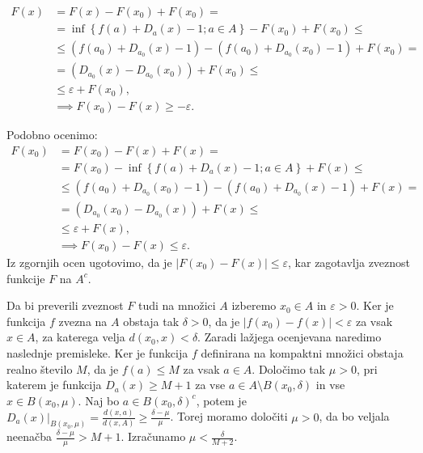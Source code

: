 \documentclass[mat1]{fmfdelo}
\newcommand{\0}{\underline{0}}
\begin{document}
\begin{dokaz}
\begin{equation*} \label{eq1}
\begin{split}
F(x) & = F(x) - F(x_0) + F(x_0) = \\
& = \inf \left \{ f(a) + D_a(x) - 1; a \in A \right \} - F(x_0) + F(x_0) \leq \\
& \leq (f(a_0) + D_{a_0}(x) - 1) -  (f(a_0) + D_{a_0}(x_0) - 1) + F(x_0) = \\
& = (D_{a_0}(x) -  D_{a_0}(x_0)) + F(x_0) \leq \\
& \leq \varepsilon + F(x_0), \\
& \implies F(x_0) - F(x) \geq -\varepsilon.
\end{split}
\end{equation*}

Podobno ocenimo:
\begin{equation*} \label{eq1}
\begin{split}
F(x_0) & = F(x_0) - F(x) + F(x) = \\
& = F(x_0) - \inf \left \{ f(a) + D_a(x) - 1; a \in A \right \} + F(x) \leq \\
& \leq (f(a_0) + D_{a_0}(x_0) - 1) -  (f(a_0) + D_{a_0}(x) - 1) + F(x) = \\
& = (D_{a_0}(x_0) -  D_{a_0}(x)) + F(x) \leq \\
& \leq \varepsilon + F(x), \\
& \implies F(x_0) - F(x) \leq \varepsilon.
\end{split}
\end{equation*}
Iz zgornjih ocen ugotovimo, da je $|F(x_0) - F(x)| \leq \varepsilon$, kar zagotavlja zveznost funkcije $F$ na $A^c$.

Da bi preverili zveznost $F$ tudi na množici $A$ izberemo $x_0 \in A$ in $\varepsilon > 0$. Ker je funkcija $f$ zvezna na $A$ obstaja tak $\delta > 0$, da je $|f(x_0) - f(x)| < \varepsilon$ za vsak $x \in A$, za katerega velja $d(x_0, x) < \delta$. Zaradi lažjega ocenjevana naredimo naslednje premisleke. Ker je funkcija $f$ definirana na kompaktni množici obstaja realno število $M$, da je $f(a) \leq M$ za vsak $a \in A$. Določimo tak $\mu >0$, pri katerem je funkcija $D_a(x) \geq M + 1$ za vse $a \in A \setminus B(x_0, \delta)$ in vse $x \in B(x_0, \mu)$. Naj bo $a \in B(x_0, \delta)^c$, potem je
$D_a(x)|_{B(x_0, \mu)}= \frac{d(x, a)}{d(x, A)} \geq \frac{\delta - \mu}{\mu}$. Torej moramo določiti $\mu > 0$, da bo veljala neenačba $\frac{\delta - \mu}{\mu} > M + 1$. Izračunamo $\mu <\frac{\delta}{M + 2}$.



\end{dokaz}
\end{document}
